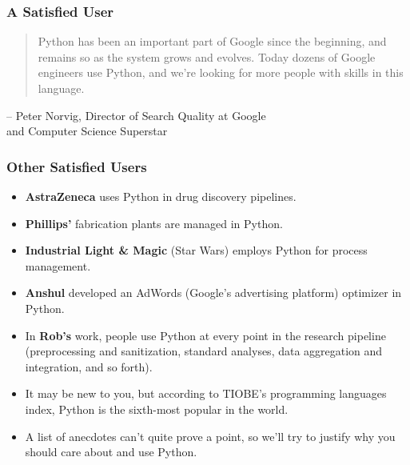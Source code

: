 \documentclass[10pt]{beamer}
\begin{document}
\begin{frame}
  \frametitle{A Satisfied User}
  \begin{quote}
      Python has been an important part of Google since the beginning, and remains so as the system grows and evolves. Today dozens of Google engineers use Python, and we're looking for more people with skills in this language.
  \end{quote}
  \begin{flushright}
    \footnotesize
    -- Peter Norvig, Director of Search Quality at Google \\ and Computer Science Superstar
  \end{flushright}
\end{frame}

\begin{frame}
  \frametitle{Other Satisfied Users}
  \begin{itemize}
    \item \textbf{AstraZeneca} uses Python in drug discovery pipelines.
    \item \textbf{Phillips'} fabrication plants are managed in Python.
    \item \textbf{Industrial Light \& Magic} (Star Wars) employs Python for process management.
    \item \textbf{Anshul} developed an AdWords (Google's advertising platform) optimizer in Python.
    \item In \textbf{Rob's} work, people use Python at every point in the research pipeline (preprocessing and sanitization, standard analyses, data aggregation and integration, and so forth).
    \item It may be new to you, but according to TIOBE's programming languages index, Python is the sixth-most popular in the world.
    \item A list of anecdotes can't quite prove a point, so we'll try to justify why you should care about and use Python.
  \end{itemize}
\end{frame}
\end{document}
